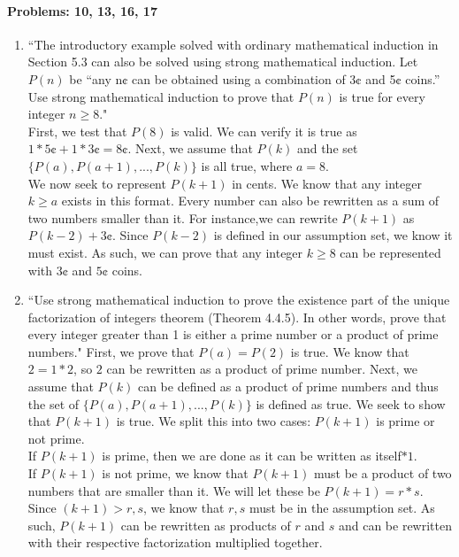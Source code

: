 \documentclass{article}
\makeatletter
\newcommand\setItemnumber[1]{\setcounter{enum\romannumeral\@enumdepth}{\numexpr#1-1\relax}}
\makeatother
\begin{document}
\paragraph{Problems: 10, 13, 16, 17}
\begin{enumerate}
    \setItemnumber{10}
    \item ``The introductory example solved with ordinary mathematical induction in Section 5.3 can also be solved using strong mathematical induction. Let $P(n)$ be “any n¢ can be obtained using a combination of 3¢ and 5¢ coins.” Use strong mathematical induction to prove that $P(n)$ is true for every integer $n\geq8$."\\
    First, we test that $P(8)$ is valid. We can verify it is true as $1*5\cent+1*3\cent= 8\cent$.
    Next, we assume that $P(k)$ and the set $\{P(a),P(a+1),...,P(k)\}$ is all true, where $a=8$.\\
    We now seek to represent $P(k+1)$ in cents. We know that any integer $k\geq a$ exists in this format. Every number can also be rewritten as a sum of two numbers smaller than it. For instance,we can rewrite $P(k+1)$ as $P(k-2) + 3\cent$. Since $P(k-2)$ is defined in our assumption set, we know it must exist. As such, we can prove that any integer $k\geq8$ can be represented with $3\cent$ and $5\cent$ coins.

    \setItemnumber{13}
    \item ``Use strong mathematical induction to prove the existence part of the unique factorization of integers theorem (Theorem 4.4.5). In other words, prove that every integer greater than 1 is either a prime number or a product of prime numbers."
    First, we prove that $P(a)=P(2)$ is true. We know that $2=1*2$, so $2$ can be rewritten as a product of prime number.
    Next, we assume that $P(k)$ can be defined as a product of prime numbers and thus the set of $\{P(a),P(a+1),...,P(k)\}$ is defined as true. We seek to show that $P(k+1)$ is true.
    We split this into two cases: $P(k+1)$ is prime or not prime.\\
    If $P(k+1)$ is prime, then we are done as it can be written as itself$*1$.\\
    If $P(k+1)$ is not prime, we know that $P(k+1)$ must be a product of two numbers that are smaller than it. We will let these be $P(k+1) = r*s$. Since $(k+1)>r,s$, we know that $r,s$ must be in the assumption set. As such, $P(k+1)$ can be rewritten as products of $r$ and $s$ and can be rewritten with their respective factorization multiplied together.


\end{enumerate}
\end{document}
